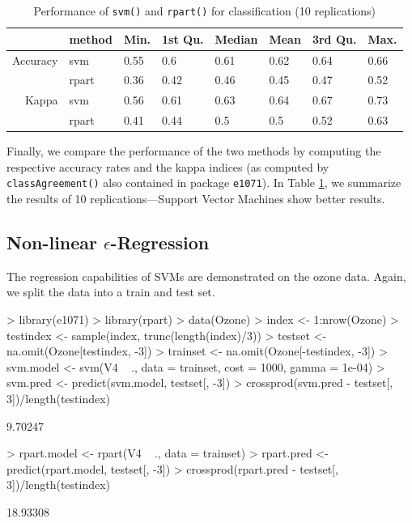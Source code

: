 \documentclass[a4paper]{article}
\newcommand{\pkg}[1]{\texttt{#1}}
\begin{document}

\begin{Schunk}
\begin{table}[ht]
\begin{center}
\begin{tabular}{rlllllll}
\hline
 & method & Min. & 1st Qu. & Median & Mean & 3rd Qu. & Max. \\
\hline
Accuracy &   svm & 0.55 &  0.6 & 0.61 & 0.62 & 0.64 & 0.66 \\
 & rpart & 0.36 & 0.42 & 0.46 & 0.45 & 0.47 & 0.52 \\
Kappa &   svm & 0.56 & 0.61 & 0.63 & 0.64 & 0.67 & 0.73 \\
  & rpart & 0.41 & 0.44 &  0.5 &  0.5 & 0.52 & 0.63 \\
\hline
\end{tabular}
\caption{Performance of \texttt{svm()} and
       \texttt{rpart()} for classification (10 replications)}
\label{tab:class}
\end{center}
\end{table}\end{Schunk}
\noindent Finally, we compare the performance of the two methods by computing the 
respective accuracy rates and the kappa indices (as computed by \texttt{classAgreement()}
also contained in package \pkg{e1071}). In Table \ref{tab:class}, we
summarize the results of 10 replications---Support Vector Machines show better results.

\subsection*{Non-linear $\epsilon$-Regression}

The regression capabilities of SVMs are demonstrated on the
ozone data. Again, we split the data
into a train and test set.

\begin{Schunk}
\begin{Sinput}
> library(e1071)
> library(rpart)
> data(Ozone)
> index <- 1:nrow(Ozone)
> testindex <- sample(index, trunc(length(index)/3))
> testset <- na.omit(Ozone[testindex, -3])
> trainset <- na.omit(Ozone[-testindex, -3])
> svm.model <- svm(V4 ~ ., data = trainset, cost = 1000, gamma = 1e-04)
> svm.pred <- predict(svm.model, testset[, -3])
> crossprod(svm.pred - testset[, 3])/length(testindex)
\end{Sinput}
\begin{Soutput}
        [,1]
[1,] 9.70247
\end{Soutput}
\begin{Sinput}
> rpart.model <- rpart(V4 ~ ., data = trainset)
> rpart.pred <- predict(rpart.model, testset[, -3])
> crossprod(rpart.pred - testset[, 3])/length(testindex)
\end{Sinput}
\begin{Soutput}
         [,1]
[1,] 18.93308
\end{Soutput}
\end{Schunk}
\end{document}
